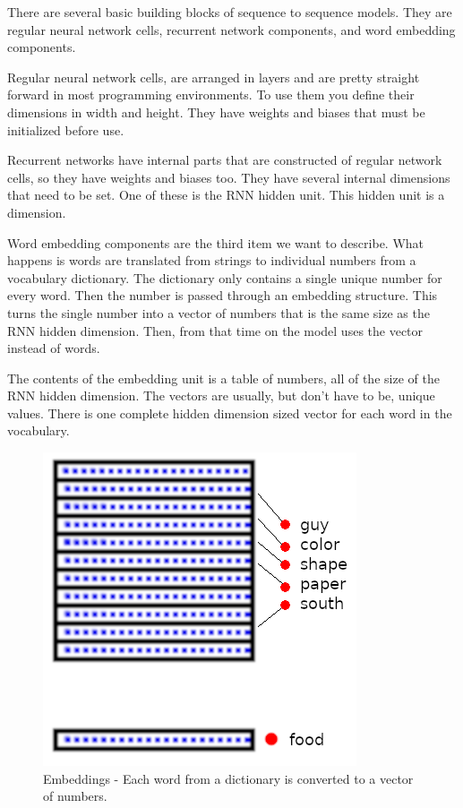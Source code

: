 There are several basic building blocks of sequence to sequence models. 
They are regular neural network cells, recurrent
network components, and word embedding components.

Regular neural network cells, are arranged in layers and are pretty
straight forward in most programming environments. To use them you
define their dimensions in width and height. They have weights and
biases that must be initialized before use.

Recurrent networks have internal parts that are constructed of regular
network cells, so they have weights and biases too. They have several
internal dimensions that need to be set. One of these is the RNN hidden
unit. This hidden unit is a dimension.

Word embedding components are the third item we want to describe.
What happens is words are translated from strings to individual numbers
from a vocabulary dictionary. The dictionary only contains a single
unique number for every word. Then the number is passed through an
embedding structure. This turns the single number into a vector of
numbers that is the same size as the RNN hidden dimension. Then, from
that time on the model uses the vector instead of words.

The contents of the embedding unit is a table of numbers, all of the
size of the RNN hidden dimension. The vectors are usually, but don\textquoteright t
have to be, unique values. There is one complete hidden dimension
sized vector for each word in the vocabulary. 

\begin{figure}[H]
	\begin{center}
	\includegraphics[scale=0.5]{diagram-embedding}
	
	
\end{center}
	\caption[Word Embeddings]{Embeddings - Each word from a dictionary is converted to a vector of numbers.}
	
\end{figure}

